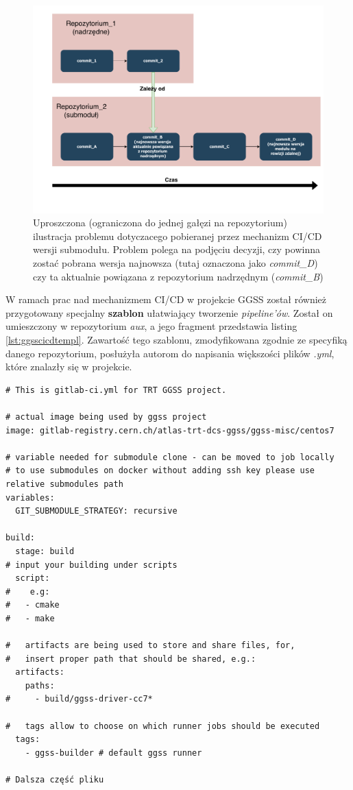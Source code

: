 \begin{figure}[H]
\centering
\caption{Uproszczona (ograniczona do jednej gałęzi na repozytorium) ilustracja problemu dotyczacego pobieranej przez mechanizm CI/CD wersji submodułu. Problem polega na podjęciu decyzji, czy powinna zostać pobrana wersja najnowsza (tutaj oznaczona jako \textit{commit\_D}) czy ta aktualnie powiązana z repozytorium nadrzędnym (\textit{commit\_B})}
\label{fig:submoduleProblem}
\includegraphics[width=\textwidth]{res/SubmodulesProblem}
\end{figure}


W ramach prac nad mechanizmem CI/CD w projekcie GGSS został również przygotowany specjalny \textbf{szablon} ułatwiający tworzenie \textit{pipeline'ów}. Został on umieszczony w repozytorium \textit{aux}, a jego fragment przedstawia listing \ref{lst:ggsscicdtempl}. Zawartość tego szablonu, zmodyfikowana zgodnie ze specyfiką danego repozytorium, posłużyła autorom do napisania większości plików \textit{.yml}, które znalazły się w projekcie.

\begin{lstlisting}[caption={Fragment szablonu ułatwiającego pisanie plików \textit{.gitlab-ci.yml} znajdującego się w repozytorium \textit{aux}}, label={lst:ggsscicdtempl}]
# This is gitlab-ci.yml for TRT GGSS project.

# actual image being used by ggss project
image: gitlab-registry.cern.ch/atlas-trt-dcs-ggss/ggss-misc/centos7

# variable needed for submodule clone - can be moved to job locally
# to use submodules on docker without adding ssh key please use relative submodules path
variables:
  GIT_SUBMODULE_STRATEGY: recursive

build:
  stage: build
# input your building under scripts
  script:
#    e.g:
#   - cmake
#   - make

#   artifacts are being used to store and share files, for,
#   insert proper path that should be shared, e.g.:
  artifacts:
    paths:
#     - build/ggss-driver-cc7*

#   tags allow to choose on which runner jobs should be executed
  tags:
    - ggss-builder # default ggss runner

# Dalsza część pliku

\end{lstlisting}


